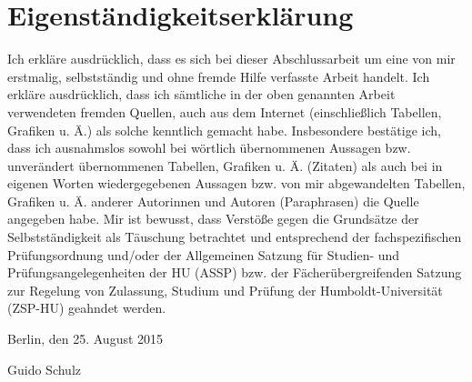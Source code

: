 
\section*{Eigenständigkeitserklärung}

Ich erkläre ausdrücklich, dass es sich bei dieser Abschlussarbeit um eine von mir erstmalig, selbstständig und ohne fremde Hilfe verfasste Arbeit handelt. Ich erkläre ausdrücklich, dass ich sämtliche in der oben genannten Arbeit
verwendeten fremden Quellen, auch aus dem Internet (einschließlich Tabellen,
Grafiken u. Ä.) als solche kenntlich gemacht habe. Insbesondere bestätige ich,
dass ich ausnahmslos sowohl bei wörtlich übernommenen Aussagen bzw.
unverändert übernommenen Tabellen, Grafiken u. Ä. (Zitaten) als auch bei in
eigenen Worten wiedergegebenen Aussagen bzw. von mir abgewandelten
Tabellen, Grafiken u. Ä. anderer Autorinnen und Autoren (Paraphrasen) die
Quelle angegeben habe. Mir ist bewusst, dass Verstöße gegen die Grundsätze der Selbstständigkeit als
Täuschung betrachtet und entsprechend der fachspezifischen Prüfungsordnung
und/oder der Allgemeinen Satzung für Studien- und Prüfungsangelegenheiten
der HU (ASSP) bzw. der Fächerübergreifenden Satzung zur Regelung von
Zulassung, Studium und Prüfung der Humboldt-Universität (ZSP-HU) geahndet
werden.

\vspace{1cm}

Berlin, den 25. August 2015 \vspace{1.5cm}

Guido Schulz
